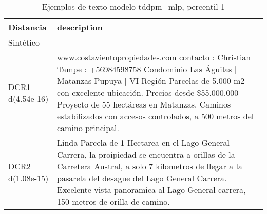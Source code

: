\begin{table}[H]
\centering
\fontsize{10}{14}\selectfont
\caption{Ejemplos de texto modelo tddpm\_mlp, percentil 1}
\label{table-example-economicos-b-1-tddpm_mlp-1p-text}
\begin{tabular}{|l|m{35em}|}
\hline
\rowcolor[gray]{0.8}
Distancia & description \\
\hline Sintético &  \\
\hline DCR1 d(4.54e-16) & www.costavientopropiedades.com contacto : Christian Tampe : +56984598758  Condominio Las \'Aguilas | Matanzas-Pupuya | VI Regi\'on  Parcelas de 5.000 m2 con excelente ubicaci\'on. Precios desde \$55.000.000  Proyecto de 55 hect\'areas en Matanzas. Caminos estabilizados con accesos controlados, a 500 metros del camino principal. \\
\hline DCR2 d(1.08e-15) & Linda Parcela de 1 Hectarea en el Lago General Carrera, la proipiedad se encuentra a orillas de la Carretera Austral, a solo 7 kilometros de llegar a la pasarela del desague del Lago General Carrera.
Excelente vista panoramica al Lago General carrera, 150 metros de orilla de camino. \\
\hline
\end{tabular}
\end{table}
